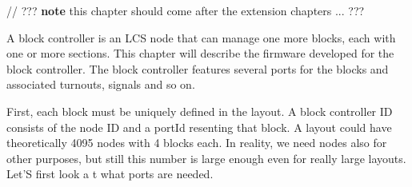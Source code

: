
// ??? \textbf{note} this chapter should come after the extension chapters ... ???

A block controller is an LCS node that can manage one more blocks, each with one or more sections. This chapter will describe the firmware developed for the block controller. The block controller features several ports for the blocks and associated turnouts, signals and so on.

First, each block must be uniquely defined in the layout. A block controller ID consists of the node ID and a portId resenting that block. A layout could have theoretically 4095 nodes with 4 blocks each. In reality, we need nodes also for other purposes, but still this number is large enough even for really large layouts. Let'S first look a t what ports are needed.



